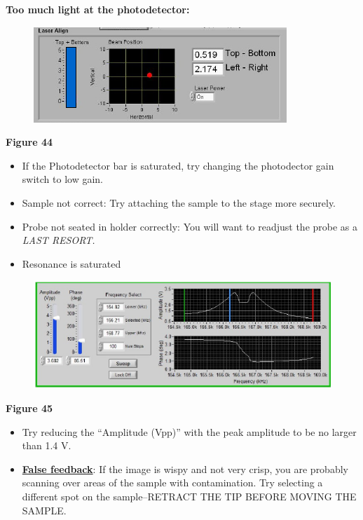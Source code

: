 \documentclass{../lab}
\begin{document}
\textbf{Too much light at the photodetector:}


\begin{figure}[h]
    \centering
    \href{http://dev-physicsadv.pantheon.berkeley.edu/sites/default/files/AFMImages/53.png}{\includegraphics[width=0.5\linewidth]{images/53.png}}
    \caption{}
    \label{fig:53}
\end{figure}

\textbf{Figure 44}

\begin{itemize}
    \item If the Photodetector bar is saturated, try changing the photodector gain switch to low gain.

\end{itemize}

\begin{itemize}
    \item Sample not correct:  Try attaching the sample to the stage more securely.

    \item Probe not seated in holder correctly:  You will want to readjust the probe as a \emph{LAST RESORT.}

    \item Resonance is saturated

\end{itemize}


\begin{figure}[h]
    \centering
    \href{http://dev-physicsadv.pantheon.berkeley.edu/sites/default/files/AFMImages/54.png}{\includegraphics[width=0.5\linewidth]{images/54.png}}
    \caption{}
    \label{fig:54}
\end{figure}

\textbf{Figure 45}

\begin{itemize}
    \item Try reducing the ``Amplitude (Vpp)'' with the peak amplitude to be no larger than 1.4 V.

    \item \href{http://experimentationlab.berkeley.edu/sites/default/files/AFMImages/VM\%204.2.\%20On\%20Cont-small\%20vib\_converted\_r1.mp4}{\textbf{False feedback}}:  If the image is wispy and not very crisp, you are probably scanning over areas of the sample with contamination.  Try selecting a different spot on the sample--RETRACT THE TIP BEFORE MOVING THE SAMPLE.

\end{itemize}
\end{document}
